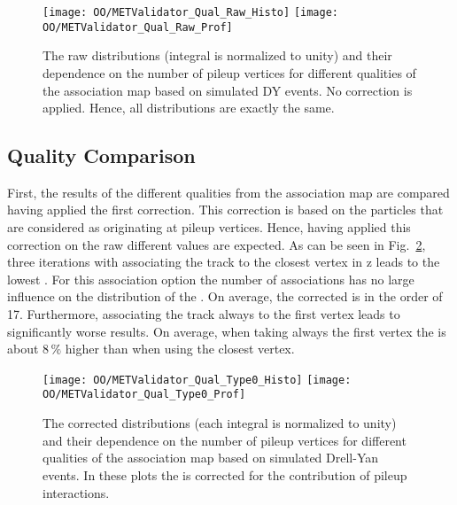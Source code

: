 \begin{figure}[h!t]
  \centering
  \texttt{[image: OO/METValidator\_Qual\_Raw\_Histo]}
  \texttt{[image: OO/METValidator\_Qual\_Raw\_Prof]}
  \caption[The raw \MET{} distributions and their dependence on the number of pileup vertices for different qualities based on simulated DY events]{The raw \MET{} distributions (integral is normalized to unity) and their dependence on the number of pileup vertices for different qualities of the association map based on simulated DY events. No correction is applied. Hence, all distributions are exactly the same. \label{plot:OOMetRaw}}
\end{figure}

\subsection{Quality Comparison \label{sec:OOMetQual}}

First, the results of the different qualities from the association map are compared having applied the first \MET{} correction. This correction is based on the particles that are considered as originating at pileup vertices. Hence, having applied this correction on the raw \MET{} different values are expected. As can be seen in Fig.~\ref{plot:OOMetQual}, three iterations with associating the track to the closest vertex in z leads to the lowest \MET{}. For this association option the number of associations has no large influence on the distribution of the \MET{}. On average, the corrected \MET{} is in the order of 17\GeV{}. Furthermore, associating the track always to the first vertex leads to significantly worse results. On average, when taking always the first vertex the \MET{} is about $8\,\%$ higher than when using the closest vertex. 

\begin{figure}[h!t]
  \centering
  \texttt{[image: OO/METValidator\_Qual\_Type0\_Histo]}
  \texttt{[image: OO/METValidator\_Qual\_Type0\_Prof]}
  \caption[The corrected \MET{} distributions and their dependence on the number of pileup vertices for different qualities based on simulated Drell-Yan events]{The corrected \MET{} distributions (each integral is normalized to unity) and their dependence on the number of pileup vertices for different qualities of the association map based on simulated Drell-Yan events. In these plots the \MET{} is corrected for the contribution of pileup interactions. \label{plot:OOMetQual}}
\end{figure}

